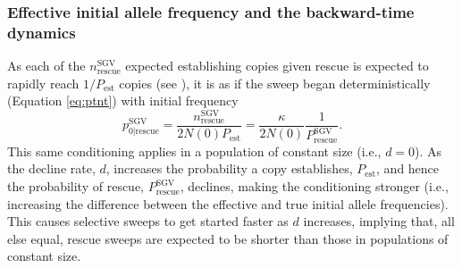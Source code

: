 \documentclass[]{article}
\begin{document}
\subsubsection*{Effective initial allele frequency and the backward-time dynamics}

As each of the $n^\mathrm{SGV}_\mathrm{rescue}$ expected establishing copies given rescue is expected to rapidly reach $1/P_\mathrm{est}$ copies (see ), it is as if the sweep began deterministically (Equation \ref{eq:ptnt}) with initial frequency \citep[c.f., equation S1.4 in][]{orr2014population}
\begin{equation}\label{eq:p0sgv}
p_{0|\mathrm{rescue}}^\mathrm{SGV} = \frac{n^\mathrm{SGV}_\mathrm{rescue}}{2N(0)P_\mathrm{est}} = \frac{\kappa}{2N(0)} \frac{1}{P_{\mathrm{rescue}}^{\mathrm{SGV}}}.
\end{equation}
This same conditioning applies in a population of constant size (i.e., $d=0$).
As the decline rate, $d$, increases the probability a copy establishes, $P_\mathrm{est}$, and hence the probability of rescue, $P_\mathrm{rescue}^\mathrm{SGV}$, declines, making the conditioning stronger (i.e., increasing the difference between the effective and true initial allele frequencies).
This causes selective sweeps to get started faster as $d$ increases, implying that, all else equal, rescue sweeps are expected to be shorter than those in populations of constant size.
\end{document}
